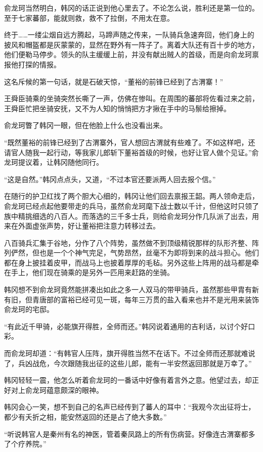 俞龙珂当然明白，韩冈的话正说到他心里去了。不论怎么说，胜利还是第一位的。至于七家蕃部，能就则救，救不了拉倒，不用太在意。

终于……一缕尘烟自远方腾起，马蹄声随之传来，一队骑兵急速奔回，他们身上的披风和帽盔都是灰蒙蒙的，显然在野外有一阵子了。离着大队还有百十步的地方，他们便勒马停步。领头的队主缓缓上前，并没有献出贼人的首级，而是向俞龙珂禀报他打探的情报。

这名斥候的第一句话，就是石破天惊，“董裕的前锋已经到了古渭寨！”

王舜臣骑乘的坐骑突然长嘶了一声，仿佛在惨叫。在周围的蕃部将佐看过来之前，王舜臣忙把坐骑安抚，又不为人知的悄悄把方才揪在手中的马鬃给擦掉。

俞龙珂瞥了韩冈一眼，但在他脸上什么也没看出来。

“既然董裕的前锋已经到了古渭寨外，官人想回古渭就有些难了。不如这样吧，还请官人随我一起行动，等我家儿郎斩下董裕首级的时候，也好让官人做个见证。”俞龙珂提议着，让韩冈随他同行。

“这是自然。”韩冈点点头，又道，“不过本官还要派两人回去报个信。”

在随行的护卫红找了两个胆大心细的，韩冈让他们回去禀报王韶。两人领命走后，俞龙珂已经点起他要带走的兵马，虽然俞龙珂麾下战士数以千计，但他这时只领了族中精挑细选的八百人。而落选的三千多士兵，则给俞龙珂分作几队派了出去，用来在外面虚张声势，好让董裕把注意力转移过去。

八百骑兵汇集于谷地，分作了八个阵势，虽然做不到顶级精锐那样的队形齐整、阵列俨然，但也是一个个神气完足，气势昂然，丝毫不为即将到来的战斗担心。他们都在身上披挂着皮甲，而战马上也披着厚厚的毛毡。另外这些上阵用的战马都是牵在手上，他们现在骑乘的是另外一匹用来赶路的坐骑。

韩冈想不到俞龙珂竟然能拼凑出如此之多一人双马的带甲骑兵，虽然那些甲胄有新有旧，但青唐部的富裕已经可见一斑，每年三万贯的盐入看来也并不是光用来装饰俞龙珂的宅邸。

“有此近千甲骑，必能旗开得胜，全师而还。”韩冈说着通用的吉利话，以讨个好口彩。

而俞龙珂却道：“有韩官人压阵，旗开得胜当然不在话下。不过全师而还那就难说了，兵凶战危，今次跟随我出征的这些儿郎，能有一半安然返回那就是万幸了。”

韩冈轻轻一震，他怎么听着俞龙珂的一番话中好像有着言外之意。他望过去，却正好对上俞龙珂蕴意颇深的眼神。

韩冈会心一笑，想不到自己的名声已经传到了蕃人的耳中：“我观今次出征将士，都少有夭折之相，能安然返回的还是占了绝大多数。”

“听说韩官人是秦州有名的神医，管着秦凤路上的所有伤病营。好像连古渭寨都多了个疗养院。”

